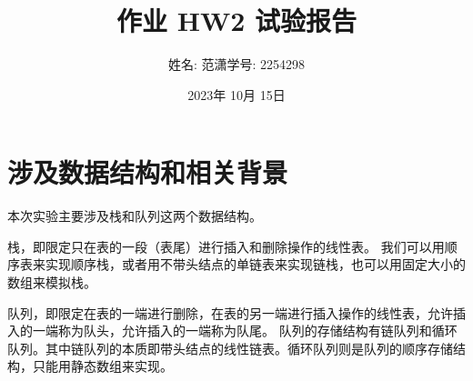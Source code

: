 \documentclass[a4paper,11pt]{article}%
\author{姓名: 范潇\phantom{11}学号: 2254298}
\title{作业 HW2 试验报告}
\date{2023年 10月 15日}
\begin{document}
\lstset{breaklines}%
		\lstset{extendedchars=false}%
\pagestyle{plain}%
\maketitle
\section{涉及数据结构和相关背景}
本次实验主要涉及栈和队列这两个数据结构。

栈，即限定只在表的一段（表尾）进行插入和删除操作的线性表。
我们可以用顺序表来实现顺序栈，或者用不带头结点的单链表来实现链栈，也可以用固定大小的数组来模拟栈。

队列，即限定在表的一端进行删除，在表的另一端进行插入操作的线性表，允许插入的一端称为队头，允许插入的一端称为队尾。
队列的存储结构有链队列和循环队列。其中链队列的本质即带头结点的线性链表。循环队列则是队列的顺序存储结构，只能用静态数组来实现。
\end{document}
